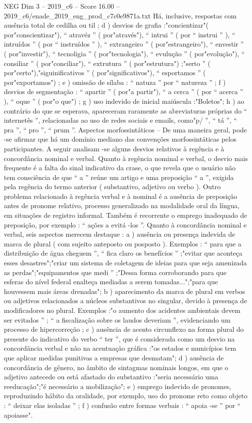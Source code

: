 \begin{textsample}{NEG Dim 3 – 2019\_c6 – Score 16.00 – 2019\_c6/enade\_2019\_eng\_prod\_c7c0e9871a.txt}
Há, inclusive, respostas com ausência total de cedilha ou til ; d ) desvios de grafia :"concientizar"( por"conscientizar"), “ atravéz ” ( por"através"), “ intrui ” ( por “ instrui ” ), “ intruídos ” ( por “ instruídos ” ), “ extrangeiro ” ( por"estrangeiro"), “ envestir ” ( por"investir"), “ tecnoligia ” ( por"tecnologia"), “ evulução ” ( por"evolução"), “ consiliar ” ( por"conciliar"), “ extrutura ” ( por"estrutura") ;"serto ” ( por"certo"),"siguinificativos ” ( por"significativos"), “ esportamos ” ( por"exportamos") ; e ) omissão de sílaba : “ natuza ” por “ natureza ” ; f ) desvios de segmentação : “ apartir ” ( por"a partir"), “ a cerca ” ( por “ acerca ” ), “ oque ” ( por"o que") ; g ) uso indevido de inicial maiúscula :"Boletos"; h ) ao contrário do que se esperava, apareceram raramente as abreviaturas próprias do “ internetês ”, relacionadas ao uso de redes sociais e emails, como"p/ ”, “ tá ”, “ pra ”, “ pro ”, “ prum ”.
Aspectos morfossintáticos – De uma maneira geral, pode -se afirmar que há um domínio mediano das convenções morfossintáticas pelos participantes.
A seguir analisam -se alguns desvios relativos à regência e à concordância nominal e verbal.
Quanto à regência nominal e verbal, o desvio mais frequente é a falta do sinal indicativo da crase, o que revela que o usuário não tem consciência de que “ a ” reúne um artigo e uma preposição “ a ”, exigida pela regência do termo anterior ( substantivo, adjetivo ou verbo ).
Outro problema relacionado à regência verbal e à nominal é a ausência de preposição antes de pronome relativo, processo generalizado na modalidade oral da língua, em situações de registro informal.
Também é recorrente o emprego inadequado de preposição, por exemplo : “ ações a evitá -los ”.
Quanto à concordância nominal e verbal, seis aspectos merecem destaque : a ) ausência ou presença indevida de marca de plural ( com sujeito anteposto ou posposto ).
Exemplos : “ para que a distribuição de água cheguem ”, “ fica claro os benefícios ” ;"evitar que aconteça esses desastres";"criar um sistema de coletagem de ideias para que seja amenizada as perdas";"equipamentos que medi ” ;"Dessa forma corroborando para que esferas do nível federal enalteça mediadas a serem tomadas...";"para que houvessem mais áreas drenadas"; b ) aparecimento da marca de plural em verbos ou adjetivos relacionados a núcleos substantivos no singular, devido à presença de modificadores no plural.
Exemplos :"o aumento dos acidentes ambientais devem ser evitados ” ; “ a fiscalização sobre os laudos deveriam ”, evidenciando um processo de hipercorreção ; c ) ausência de acento circunflexo na forma plural do presente do indicativo do verbo “ ter ”, que é considerada como um desvio na concordância verbal e não na acentuação gráfica :"os estados e municípios tem que aplicar medidas punitivas a empresas que desmatam"; d ) ausência de concordância de gênero, no âmbito de sintagmas nominais longos, em que o adjetivo antecede ou está afastado do substantivo :"seria necessário uma reeducação";"é necessário a mobilização"; e ) emprego indevido de pronomes, reproduzindo hábito da oralidade, por exemplo, uso do pronome reto como objeto : “ deixar elas isoladas ” ; f ) confusão entre formas verbais : “ apoia -se ” por “ apoiasse".

\end{textsample}
